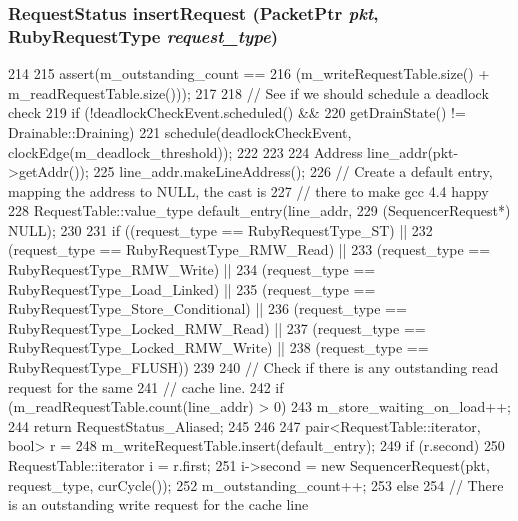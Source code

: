 \hypertarget{classSequencer_ad7e26bff5c0772136a69fc46fb6b6b21}{
\subsubsection[{insertRequest}]{\setlength{\rightskip}{0pt plus 5cm}RequestStatus insertRequest ({\bf PacketPtr} {\em pkt}, \/  RubyRequestType {\em request\_\-type})}}
\label{classSequencer_ad7e26bff5c0772136a69fc46fb6b6b21}



\begin{DoxyCode}
214 {
215     assert(m_outstanding_count ==
216         (m_writeRequestTable.size() + m_readRequestTable.size()));
217 
218     // See if we should schedule a deadlock check
219     if (!deadlockCheckEvent.scheduled() &&
220         getDrainState() != Drainable::Draining) {
221         schedule(deadlockCheckEvent, clockEdge(m_deadlock_threshold));
222     }
223 
224     Address line_addr(pkt->getAddr());
225     line_addr.makeLineAddress();
226     // Create a default entry, mapping the address to NULL, the cast is
227     // there to make gcc 4.4 happy
228     RequestTable::value_type default_entry(line_addr,
229                                            (SequencerRequest*) NULL);
230 
231     if ((request_type == RubyRequestType_ST) ||
232         (request_type == RubyRequestType_RMW_Read) ||
233         (request_type == RubyRequestType_RMW_Write) ||
234         (request_type == RubyRequestType_Load_Linked) ||
235         (request_type == RubyRequestType_Store_Conditional) ||
236         (request_type == RubyRequestType_Locked_RMW_Read) ||
237         (request_type == RubyRequestType_Locked_RMW_Write) ||
238         (request_type == RubyRequestType_FLUSH)) {
239 
240         // Check if there is any outstanding read request for the same
241         // cache line.
242         if (m_readRequestTable.count(line_addr) > 0) {
243             m_store_waiting_on_load++;
244             return RequestStatus_Aliased;
245         }
246 
247         pair<RequestTable::iterator, bool> r =
248             m_writeRequestTable.insert(default_entry);
249         if (r.second) {
250             RequestTable::iterator i = r.first;
251             i->second = new SequencerRequest(pkt, request_type, curCycle());
252             m_outstanding_count++;
253         } else {
254           // There is an outstanding write request for the cache line
}}}
\end{DoxyCode}
